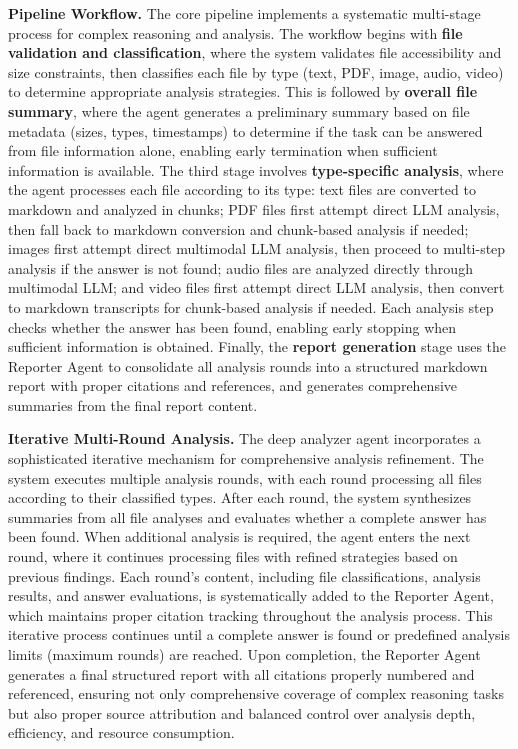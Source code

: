\documentclass[11pt]{article}
\begin{document}
\textbf{Pipeline Workflow.} The core pipeline implements a systematic multi-stage process for complex reasoning and analysis. The workflow begins with \textbf{file validation and classification}, where the system validates file accessibility and size constraints, then classifies each file by type (text, PDF, image, audio, video) to determine appropriate analysis strategies. This is followed by \textbf{overall file summary}, where the agent generates a preliminary summary based on file metadata (sizes, types, timestamps) to determine if the task can be answered from file information alone, enabling early termination when sufficient information is available. The third stage involves \textbf{type-specific analysis}, where the agent processes each file according to its type: text files are converted to markdown and analyzed in chunks; PDF files first attempt direct LLM analysis, then fall back to markdown conversion and chunk-based analysis if needed; images first attempt direct multimodal LLM analysis, then proceed to multi-step analysis if the answer is not found; audio files are analyzed directly through multimodal LLM; and video files first attempt direct LLM analysis, then convert to markdown transcripts for chunk-based analysis if needed. Each analysis step checks whether the answer has been found, enabling early stopping when sufficient information is obtained. Finally, the \textbf{report generation} stage uses the Reporter Agent to consolidate all analysis rounds into a structured markdown report with proper citations and references, and generates comprehensive summaries from the final report content.

\textbf{Iterative Multi-Round Analysis.} The deep analyzer agent incorporates a sophisticated iterative mechanism for comprehensive analysis refinement. The system executes multiple analysis rounds, with each round processing all files according to their classified types. After each round, the system synthesizes summaries from all file analyses and evaluates whether a complete answer has been found. When additional analysis is required, the agent enters the next round, where it continues processing files with refined strategies based on previous findings. Each round's content, including file classifications, analysis results, and answer evaluations, is systematically added to the Reporter Agent, which maintains proper citation tracking throughout the analysis process. This iterative process continues until a complete answer is found or predefined analysis limits (maximum rounds) are reached. Upon completion, the Reporter Agent generates a final structured report with all citations properly numbered and referenced, ensuring not only comprehensive coverage of complex reasoning tasks but also proper source attribution and balanced control over analysis depth, efficiency, and resource consumption.
\end{document}
